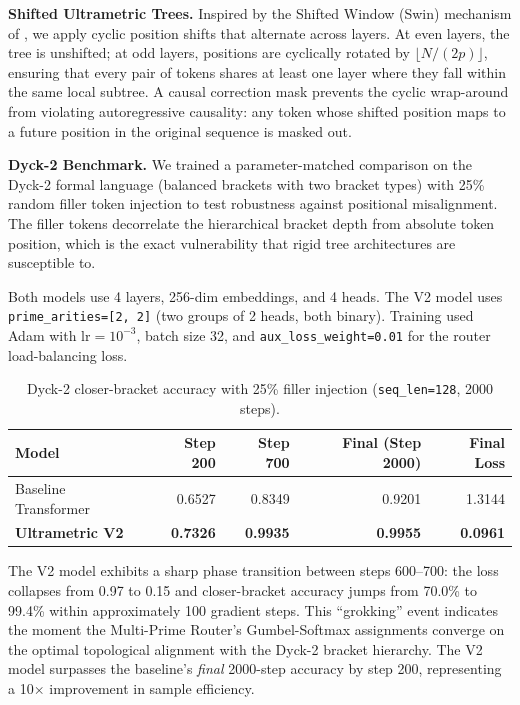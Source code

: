 \documentclass[11pt,a4paper]{article}
\begin{document}
\textbf{Shifted Ultrametric Trees.} Inspired by the Shifted Window (Swin) mechanism of \citet{liu2021swin}, we apply cyclic position shifts that alternate across layers. At even layers, the tree is unshifted; at odd layers, positions are cyclically rotated by $\lfloor N / (2p) \rfloor$, ensuring that every pair of tokens shares at least one layer where they fall within the same local subtree. A causal correction mask prevents the cyclic wrap-around from violating autoregressive causality: any token whose shifted position maps to a future position in the original sequence is masked out.

\textbf{Dyck-2 Benchmark.} We trained a parameter-matched comparison on the Dyck-2 formal language (balanced brackets with two bracket types) with 25\% random filler token injection to test robustness against positional misalignment. The filler tokens decorrelate the hierarchical bracket depth from absolute token position, which is the exact vulnerability that rigid tree architectures are susceptible to.

Both models use 4 layers, 256-dim embeddings, and 4 heads. The V2 model uses \texttt{prime\_arities=[2, 2]} (two groups of 2 heads, both binary). Training used Adam with $\text{lr}=10^{-3}$, batch size 32, and \texttt{aux\_loss\_weight=0.01} for the router load-balancing loss.

\begin{table}[h]
\centering
\caption{Dyck-2 closer-bracket accuracy with 25\% filler injection (\texttt{seq\_len=128}, 2000 steps).}
\label{tab:v2-dyck2}
\begin{tabular}{@{}lrrrr@{}}
\toprule
Model & Step 200 & Step 700 & Final (Step 2000) & Final Loss \\
\midrule
Baseline Transformer & 0.6527 & 0.8349 & 0.9201 & 1.3144 \\
\textbf{Ultrametric V2} & \textbf{0.7326} & \textbf{0.9935} & \textbf{0.9955} & \textbf{0.0961} \\
\bottomrule
\end{tabular}
\end{table}

The V2 model exhibits a sharp phase transition between steps 600--700: the loss collapses from 0.97 to 0.15 and closer-bracket accuracy jumps from 70.0\% to 99.4\% within approximately 100 gradient steps. This ``grokking'' event indicates the moment the Multi-Prime Router's Gumbel-Softmax assignments converge on the optimal topological alignment with the Dyck-2 bracket hierarchy. The V2 model surpasses the baseline's \emph{final} 2000-step accuracy by step 200, representing a 10$\times$ improvement in sample efficiency.
\end{document}
